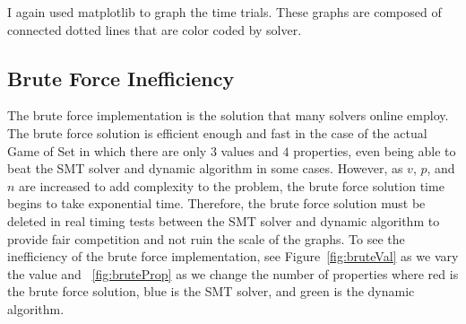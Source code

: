 \documentclass[pageno]{jpaper}
\begin{document}
I again used matplotlib to graph the time trials. These graphs are composed of connected dotted lines that are color coded by solver. 
\subsection{Brute Force Inefficiency}

The brute force implementation is the solution that many solvers online employ. The brute force solution is efficient enough and fast in the case of the actual Game of Set in which there are only $3$ values and $4$ properties, even being able to beat the SMT solver and dynamic algorithm in some cases. However, as $v$, $p$, and $n$ are increased to add complexity to the problem, the brute force solution time begins to take exponential time. Therefore, the brute force solution must be deleted in real timing tests between the SMT solver and dynamic algorithm to provide fair competition and not ruin the scale of the graphs. To see the inefficiency of the brute force implementation, see Figure~\ref{fig:bruteVal} as we vary the value and ~\ref{fig:bruteProp} as we change the number of properties where red is the brute force solution, blue is the SMT solver, and green is the dynamic algorithm.
\end{document}
